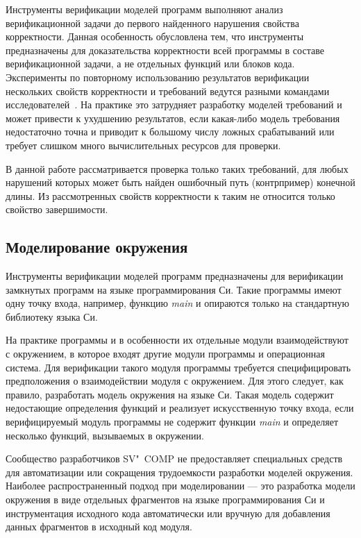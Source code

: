 Инструменты верификации моделей программ выполняют анализ верификационной задачи до первого найденного нарушения свойства корректности.
Данная особенность обусловлена тем, что инструменты предназначены для доказательства корректности всей программы в составе верификационной задачи, а не отдельных функций или блоков кода.
Эксперименты по повторному использованию результатов верификации нескольких свойств корректности и требований ведутся разными командами исследователей~\cite{CPAreuse, CMBCreuse, Apel:2016}. 
На практике это затрудняет разработку моделей требований и может привести к ухудшению результатов, если какая-либо модель требования недостаточно точна и приводит к большому числу ложных срабатываний или требует слишком много вычислительных ресурсов для проверки.

В данной работе рассматривается проверка только таких требований, для любых нарушений которых может быть найден ошибочный путь (контрпример) конечной длины.
Из рассмотренных свойств корректности к таким не относится только свойство завершимости.

\subsection{Моделирование окружения}
Инструменты верификации моделей программ предназначены для верификации замкнутых программ на языке программирования Си.
Такие программы имеют одну точку входа, например, функцию \textit{main} и опираются только на стандартную библиотеку языка Си.

На практике программы и в особенности их отдельные модули взаимодействуют с окружением, в которое входят другие модули программы и операционная система.
Для верификации такого модуля программы требуется специфицировать предположения о взаимодействии модуля с окружением.
Для этого следует, как правило, разработать модель окружения на языке Си.
Такая модель содержит недостающие определения функций и реализует искусственную точку входа, если верифицируемый модуль программы не содержит функции \textit{main} и определяет несколько функций, вызываемых в окружении.

Сообщество разработчиков SV"~COMP не предоставляет специальных средств для автоматизации или сокращения трудоемкости разработки моделей окружения.
Наиболее распространенный подход при моделировании --- это разработка модели окружения в виде отдельных фрагментов на языке программирования Си и инструментация исходного кода автоматически или вручную для добавления данных фрагментов в исходный код модуля.

